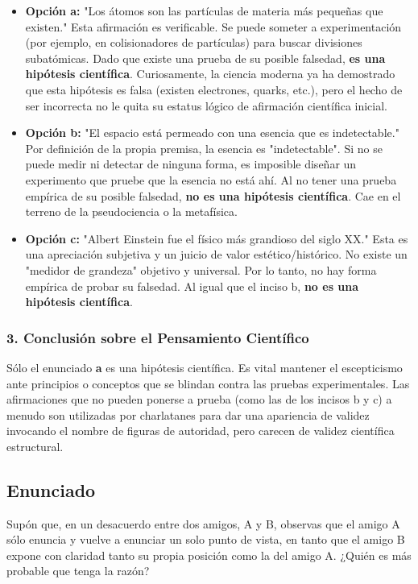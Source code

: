 \documentclass[12pt, a4paper]{article}
\begin{document}
\begin{itemize}
    \item \textbf{Opción a:} "Los átomos son las partículas de materia más pequeñas que existen." 
    Esta afirmación es verificable. Se puede someter a experimentación (por ejemplo, en colisionadores de partículas) para buscar divisiones subatómicas. Dado que existe una prueba de su posible falsedad, \textbf{es una hipótesis científica}. Curiosamente, la ciencia moderna ya ha demostrado que esta hipótesis es falsa (existen electrones, quarks, etc.), pero el hecho de ser incorrecta no le quita su estatus lógico de afirmación científica inicial.

    \item \textbf{Opción b:} "El espacio está permeado con una esencia que es indetectable."
    Por definición de la propia premisa, la esencia es "indetectable". Si no se puede medir ni detectar de ninguna forma, es imposible diseñar un experimento que pruebe que la esencia no está ahí. Al no tener una prueba empírica de su posible falsedad, \textbf{no es una hipótesis científica}. Cae en el terreno de la pseudociencia o la metafísica.

    \item \textbf{Opción c:} "Albert Einstein fue el físico más grandioso del siglo XX."
    Esta es una apreciación subjetiva y un juicio de valor estético/histórico. No existe un "medidor de grandeza" objetivo y universal. Por lo tanto, no hay forma empírica de probar su falsedad. Al igual que el inciso b, \textbf{no es una hipótesis científica}.
\end{itemize}

\subsubsection*{3. Conclusión sobre el Pensamiento Científico}
 Sólo el enunciado \textbf{a} es una hipótesis científica. Es vital mantener el escepticismo ante principios o conceptos que se blindan contra las pruebas experimentales. Las afirmaciones que no pueden ponerse a prueba (como las de los incisos b y c) a menudo son utilizadas por charlatanes para dar una apariencia de validez invocando el nombre de figuras de autoridad, pero carecen de validez científica estructural.

\newpage

\subsection*{Enunciado}
Supón que, en un desacuerdo entre dos amigos, A y B, observas que el amigo A sólo enuncia y vuelve a enunciar un solo punto de vista, en tanto que el amigo B expone con claridad tanto su propia posición como la del amigo A. ¿Quién es más probable que tenga la razón?
\end{document}
